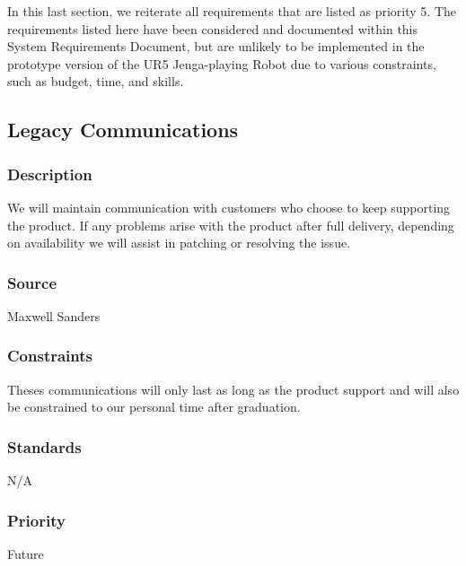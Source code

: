 In this last section, we reiterate all requirements that are listed as priority 5. The requirements listed here have been considered and documented within this System Requirements Document, but are unlikely to be implemented in the prototype version of the UR5 Jenga-playing Robot due to various constraints, such as budget, time, and skills.

\subsection{Legacy Communications}
\subsubsection{Description}
We will maintain communication with customers who choose to keep supporting the product. If any problems arise with the product after full delivery, depending on availability we will assist in patching or resolving the issue.
\subsubsection{Source}
Maxwell Sanders
\subsubsection{Constraints}
Theses communications will only last as long as the product support and will also be constrained to our personal time after graduation.
\subsubsection{Standards}
N/A
\subsubsection{Priority}
Future